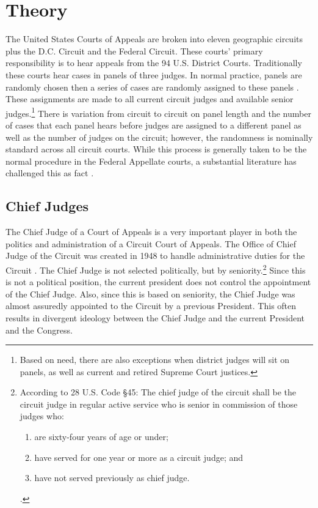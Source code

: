 \documentclass[12pt]{article}
\begin{document}
\section{Theory}\label{Theory}
The United States Courts of Appeals are broken into eleven geographic circuits plus the D.C. Circuit and the Federal Circuit. These courts' primary responsibility is to hear appeals from the 94 U.S. District Courts. Traditionally these courts hear cases in panels of three judges. In normal practice, panels are randomly chosen then a series of cases are randomly assigned to these panels \citep{Hooper2011,Journalist2011,Chilton2014,Songer2007}.  These assignments are made to all current circuit judges and available senior judges.\footnote{Based on need, there are also exceptions when district judges will sit on panels, as well as current and retired Supreme Court justices.} There is variation from circuit to circuit on panel length and the number of cases that each panel hears before judges are assigned to a different panel as well as the number of judges on the circuit; however, the randomness is nominally standard across all circuit courts.  While this process is generally taken to be the normal procedure in the Federal Appellate courts, a substantial literature has challenged this as fact \citep{Atkins1974,Brown2000,Chilton2014}.  

\subsection*{Chief Judges}
The Chief Judge of a Court of Appeals is a very important player in both the politics and administration of a Circuit Court of Appeals.  The Office of Chief Judge of the Circuit was created in 1948 to handle administrative duties for the Circuit \citep{feinberg1984office}.  The Chief Judge is not selected politically, but by seniority.\footnote{According to 28 U.S. Code \S45: The chief judge of the circuit shall be the circuit judge in regular active service who is senior in commission of those judges who:
	\begin{enumerate}[label=(\Alph*)]
	\item are sixty-four years of age or under;
	\item have served for one year or more as a circuit judge; and
	\item have not served previously as chief judge.
\end{enumerate} \citep{Journalist2011}.}  Since this is not a political position, the current president does not control the appointment of the Chief Judge.  Also, since this is based on seniority, the Chief Judge was almost assuredly appointed to the Circuit by a previous President.  This often results in divergent ideology between the Chief Judge and the current President and the Congress.
\end{document}
